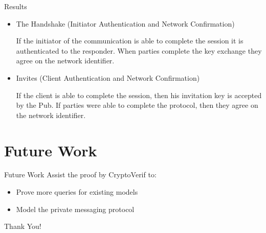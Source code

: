\documentclass{beamer}
\begin{document}
\begin{frame}{Results}
  \begin{itemize}
    \item The Handshake (Initiator Authentication and Network Confirmation)
    \begin{theorem}
      If the initiator of the communication is able to complete the session it is authenticated to the responder. When parties complete the key exchange they agree on the network identifier.
    \end{theorem}
  \item Invites (Client Authentication and Network Confirmation)
    \begin{theorem}
      If the client is able to complete the session, then his invitation key is accepted by the Pub. If parties were able to complete the protocol, then they agree on the network identifier.
    \end{theorem}
  \end{itemize}
\end{frame}

\section{Future Work}

\begin{frame}{Future Work}
  Assist the proof by CryptoVerif to:
  \begin{itemize}
    \item Prove more queries for existing models
    \item Model the private messaging protocol
  \end{itemize}
\end{frame}

\begin{frame}
\Huge{\centerline{Thank You!}}
\end{frame}

\end{document}
